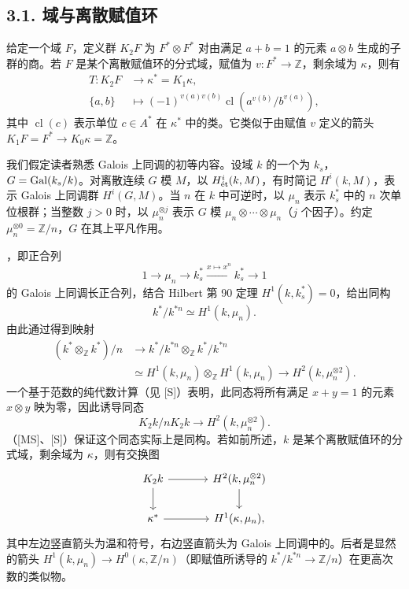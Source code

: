 \subsection*{3.1. 域与离散赋值环}
给定一个域 $F$，定义群 $K_2F$ 为 $F^*\otimes F^*$ 对由满足 $a+b=1$ 的元素 $a\otimes b$ 生成的子群的商。若 $F$ 是某个离散赋值环的分式域，赋值为 $v:F^*\longrightarrow\mathbb Z$，剩余域为 $\kappa$，则有
\[
\begin{aligned}
T:K_2F&\longrightarrow\kappa^*=K_1\kappa,\\
\{a,b\}&\longmapsto(-1)^{v(a)v(b)}\operatorname{cl}(a^{v(b)}/b^{v(a)}),
\end{aligned}
\]
其中 $\operatorname{cl}(c)$ 表示单位 $c\in A^*$ 在 $\kappa^*$ 中的类。它类似于由赋值 $v$ 定义的箭头 $K_1F=F^*\longrightarrow K_0\kappa=\mathbb Z$。

我们假定读者熟悉 Galois 上同调的初等内容。设域 $k$ 的一个为 $k_s$，$G=\operatorname{Gal}(k_s/k)$。对离散连续 $G$ 模 $M$，以 $H^i_{\mathrm{\acute et}}(k,M)$，有时简记 $H^i(k,M)$，表示 Galois 上同调群 $H^i(G,M)$。当 $n$ 在 $k$ 中可逆时，以 $\mu_n$ 表示 $k_s^*$ 中的 $n$ 次单位根群；当整数 $j>0$ 时，以 $\mu_n^{\otimes j}$ 表示 $G$ 模 $\mu_n\otimes\cdots\otimes\mu_n$（$j$ 个因子）。约定 $\mu_n^{\otimes0}=\mathbb Z/n$，$G$ 在其上平凡作用。

，即正合列
\[
1\longrightarrow\mu_n\longrightarrow k_s^*\xrightarrow{x\mapsto x^n}k_s^*\longrightarrow1
\]
的 Galois 上同调长正合列，结合 Hilbert 第 90 定理 $H^1(k,k_s^*)=0$，给出同构
\[
k^*/k^{*n}\simeq H^1(k,\mu_n).
\]
由此通过得到映射
\[
\begin{aligned}
(k^*\otimes_{\mathbb Z}k^*)/n
&\longrightarrow k^*/k^{*n}\otimes_{\mathbb Z}k^*/k^{*n}\\
&\simeq H^1(k,\mu_n)\otimes_{\mathbb Z}H^1(k,\mu_n)
\longrightarrow H^2(k,\mu_n^{\otimes2}).
\end{aligned}
\]
一个基于范数的纯代数计算（见 [S]）表明，此同态将所有满足 $x+y=1$ 的元素 $x\otimes y$ 映为零，因此诱导同态
\[
K_2k/nK_2k\longrightarrow H^2(k,\mu_n^{\otimes2}).
\]
（[MS]、[S]）保证这个同态实际上是同构。若如前所述，$k$ 是某个离散赋值环的分式域，剩余域为 $\kappa$，则有交换图
\[
\begin{tikzcd}[ampersand replacement=\&,column sep=large]
K_2k \arrow[r] \arrow[d] \& H^2(k,\mu_n^{\otimes2}) \arrow[d]\\
\kappa^* \arrow[r] \& H^1(\kappa,\mu_n),
\end{tikzcd}
\]
其中左边竖直箭头为温和符号，右边竖直箭头为 Galois 上同调中的。后者是显然的箭头 $H^1(k,\mu_n)\longrightarrow H^0(\kappa,\mathbb Z/n)$（即赋值所诱导的 $k^*/k^{*n}\longrightarrow\mathbb Z/n$）在更高次数的类似物。

